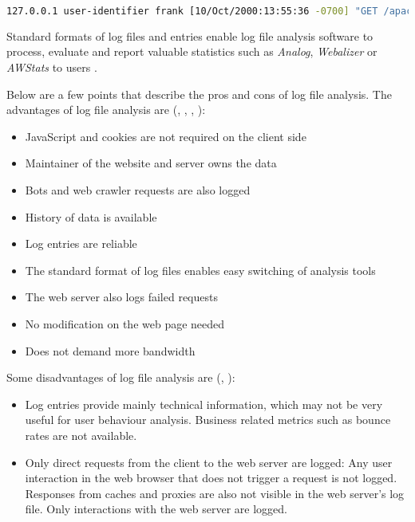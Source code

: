 \begin{center}
\begin{lstlisting}[caption={CLF}, language=bash, numbers=none, basicstyle=\tiny, label={lst:log}]
127.0.0.1 user-identifier frank [10/Oct/2000:13:55:36 -0700] "GET /apache_pb.gif HTTP/1.0" 200 2326
\end{lstlisting}
\end{center}

Standard formats of log files and entries enable log file analysis software to process, evaluate and report valuable statistics such as \textit{Analog}, \textit{Webalizer} or \textit{AWStats} to users \cite{2015Zheng}.


Below are a few points that describe the pros and cons of log file analysis.
The advantages of log file analysis are (\cite{2009Waisberg}, \cite{2011Nakatani}, \cite{2014Singal}, \cite{2015Zheng}):

\begin{itemize}
\item JavaScript and cookies are not required on the client side
\item Maintainer of the website and server owns the data %
\item Bots and web crawler requests are also logged %
\item History of data is available %
\item Log entries are reliable %
\item The standard format of log files enables easy switching of analysis tools %
\item The web server also logs failed requests %
\item No modification on the web page needed %
\item Does not demand more bandwidth %
\end{itemize}


Some disadvantages of log file analysis are (\cite{2011Marek}, \cite{2015Zheng}):

\begin{itemize}
\item Log entries provide mainly technical information, which may not be very useful for user behaviour analysis. Business related metrics such as bounce rates are not available. %
\item Only direct requests from the client to the web server are logged: Any user interaction in the web browser that does not trigger a request is not logged. Responses from caches and proxies are also not visible in the web server's log file. Only interactions with the web server are logged.
\end{itemize}



